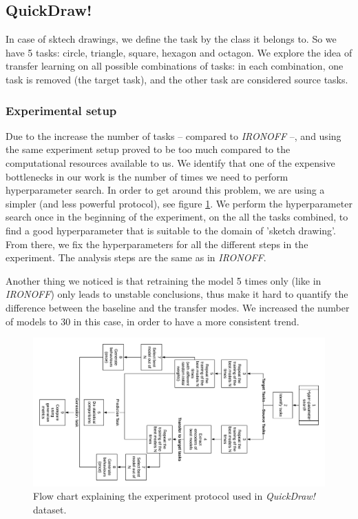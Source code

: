   \subsection{QuickDraw!}
    \par In case of sktech drawings, we define the task by the class it belongs to. So we have 5 tasks: circle, triangle, square, hexagon and octagon. We explore the idea of transfer learning on all possible combinations of tasks: in each combination, one task is removed (the target task), and the other task are considered source tasks.

    \subsubsection{Experimental setup}
    \par Due to the increase the number of tasks -- compared to \textit{IRONOFF} --, and using the same experiment setup proved to be too much compared to the computational resources available to us. We identify that one of the expensive bottlenecks in our work is the number of times we need to perform hyperparameter search. In order to get around this problem, we are using a simpler (and less powerful protocol), see figure \ref{fig:quickdraw_protocol}. We perform the hyperparameter search once in the beginning of the experiment, on the all the tasks combined, to find a good hyperparameter that is suitable to the domain of 'sketch drawing'. From there, we fix the hyperparameters for all the different steps in the experiment. The analysis steps are the same as in \textit{IRONOFF}.

    Another thing we noticed is that retraining the model 5 times only (like in \textit{IRONOFF}) only leads to unstable conclusions, thus make it hard to quantify the difference between the baseline and the transfer modes. We increased the number of models to 30 in this case, in order to have a more consistent trend.

    \begin{figure}
      \includegraphics[scale=0.3]{images/sota/quickdraw_results/QuickDraw_transfer_learning_flow.png}
      \caption{Flow chart explaining the experiment protocol used in \textit{QuickDraw!} dataset.}
      \label{fig:quickdraw_protocol}
    \end{figure}

